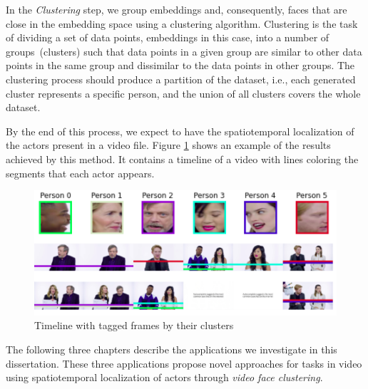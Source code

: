 In the \textit{Clustering} step, we group embeddings and, consequently, faces that are close in the embedding space using a clustering algorithm. 
%
Clustering is the task of dividing a set of data points, embeddings in this case, into a number of groups~(clusters) such that data points in a given group are similar to other data points in the same group and dissimilar to the data points in other groups.
The clustering process should produce a partition of the dataset, i.e., each generated cluster represents a specific person, and the union of all clusters covers the whole dataset.

By the end of this process, we expect to have the spatiotemporal localization of the actors present in a video file.
Figure \ref{fig:timeline} shows an example of the results achieved by this method. It contains a timeline of a video with lines coloring the segments that each actor appears.

\begin{figure}[!ht]
    \centering
    \includegraphics[width=0.6\linewidth]{img/face_clustering/timeline2.png}
    \caption{Timeline with tagged frames by their clusters}
    \label{fig:timeline}
\end{figure}

The following three chapters describe the applications we investigate in this dissertation. 
These three applications propose novel approaches for tasks in video using spatiotemporal localization of actors through \emph{video face clustering}.

